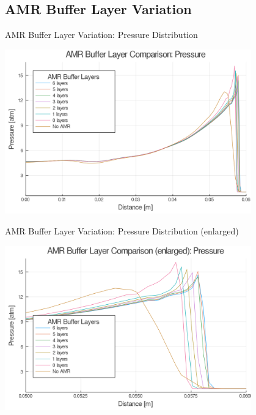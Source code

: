\subsection{AMR Buffer Layer Variation}

\begin{frame}{AMR Buffer Layer Variation: Pressure Distribution}
\begin{center}
\includegraphics[width=0.8\textwidth]{../figs/amrfigs/amr_bufflayers/p.png}
\end{center}
\end{frame}

\begin{frame}{AMR Buffer Layer Variation: Pressure Distribution (enlarged)}
\begin{center}
\includegraphics[width=0.8\textwidth]{../figs/amrfigs/amr_bufflayers/pe.png}
\end{center}
\end{frame}


